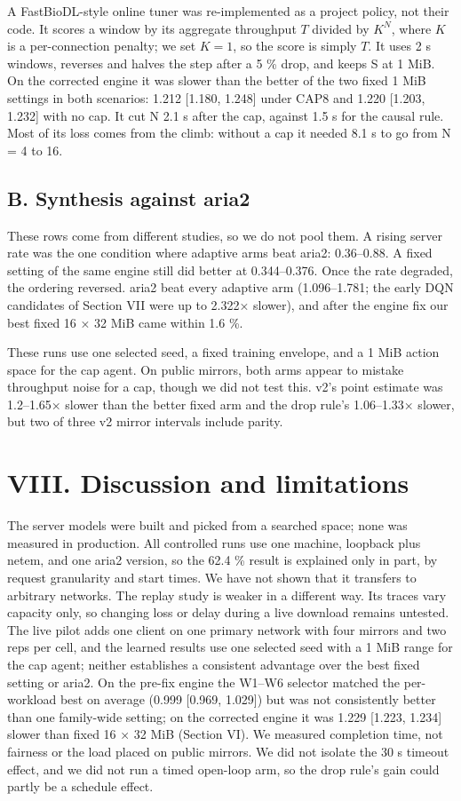 \documentclass[conference]{IEEEtran}
\begin{document}
A FastBioDL-style online tuner was re-implemented as a project policy, not their code. It scores a window by its aggregate throughput $T$ divided by $K^{N}$, where $K$ is a per-connection penalty; we set $K=1$, so the score is simply $T$. It uses 2 s windows, reverses and halves the step after a 5 \% drop, and keeps S at 1 MiB. On the corrected engine it was slower than the better of the two fixed 1 MiB settings in both scenarios: 1.212 [1.180, 1.248] under CAP8 and 1.220 [1.203, 1.232] with no cap. It cut N 2.1 s after the cap, against 1.5 s for the causal rule. Most of its loss comes from the climb: without a cap it needed 8.1 s to go from N = 4 to 16.


\subsection*{B. Synthesis against aria2}

These rows come from different studies, so we do not pool them. A rising server rate was the one condition where adaptive arms beat aria2: 0.36–0.88. A fixed setting of the same engine still did better at 0.344–0.376. Once the rate degraded, the ordering reversed. aria2 beat every adaptive arm (1.096–1.781; the early DQN candidates of Section VII were up to 2.322× slower), and after the engine fix our best fixed 16 × 32 MiB came within 1.6 \%.


These runs use one selected seed, a fixed training envelope, and a 1 MiB action space for the cap agent. On public mirrors, both arms appear to mistake throughput noise for a cap, though we did not test this. v2's point estimate was 1.2–1.65× slower than the better fixed arm and the drop rule's 1.06–1.33× slower, but two of three v2 mirror intervals include parity.


\section*{VIII. Discussion and limitations}

The server models were built and picked from a searched space; none was measured in production. All controlled runs use one machine, loopback plus netem, and one aria2 version, so the 62.4 \% result is explained only in part, by request granularity and start times. We have not shown that it transfers to arbitrary networks. The replay study is weaker in a different way. Its traces vary capacity only, so changing loss or delay during a live download remains untested. The live pilot adds one client on one primary network with four mirrors and two reps per cell, and the learned results use one selected seed with a 1 MiB range for the cap agent; neither establishes a consistent advantage over the best fixed setting or aria2. On the pre-fix engine the W1–W6 selector matched the per-workload best on average (0.999 [0.969, 1.029]) but was not consistently better than one family-wide setting; on the corrected engine it was 1.229 [1.223, 1.234] slower than fixed 16 × 32 MiB (Section VI). We measured completion time, not fairness or the load placed on public mirrors. We did not isolate the 30 s timeout effect, and we did not run a timed open-loop arm, so the drop rule's gain could partly be a schedule effect.
\end{document}
